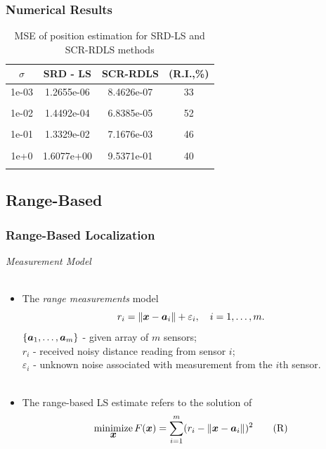 \documentclass [t] {beamer} %
\begin{document}
\begin{frame} %
\frametitle{Numerical Results}
\begin{table}
\phantom{m}
\caption{MSE of position estimation for SRD-LS and SCR-RDLS methods}
\begin{tabular}{||c||c|c|c||} 
\hhline{|t:====:t|} 
$\sigma$ & SRD - LS & SCR-RDLS & (R.I.,\%)  \\ \hline
1e-03&	1.2655e-06  & 8.4626e-07 &  33 \\ &&&\\
1e-02&	1.4492e-04 &  6.8385e-05 &  52 \\ &&&\\
1e-01&	1.3329e-02 & 7.1676e-03 &   46 \\ &&&\\
1e+0&	1.6077e+00 &  9.5371e-01 &   40  \\ %
\hhline{|b:====:b|} 
\end{tabular}
\end{table}
\end{frame}

\subsection{Range-Based}

\begin{frame} %
\frametitle{Range-Based Localization}
{\large \textit{Measurement Model}} 
\\~\\
\normalsize
\begin{itemize}
\item
The \textit{range measurements} model
\begin{equation} 
\nonumber
r_i = \|{\mbox{\boldmath$x$}} - {\mbox{\boldmath$a$}}_i\| + \varepsilon_i, \quad i = 1, \ldots , m.
\end{equation}  
$\{\mbox{\boldmath$a$}_1,\ldots, \mbox{\boldmath$a$}_m\}$ - given array of $m$ sensors;\\
$r_i$ - received noisy distance reading from sensor $i$; \\
$\varepsilon_i$ - unknown noise associated with measurement from the $i$th sensor. \\ ~\\

\item
The range-based LS  estimate refers to the solution of%
\begin{equation} \label{R-LS} 
\mathop{\mbox{minimize}}_{\mbox{\boldmath$x$}} F(\mbox{\boldmath$x$})=\sum_{i=1}^{m} (r_i - \|{\mbox{\boldmath$x$}} - {\mbox{\boldmath$a$}}_i\|)^2	\tag{R}
\end{equation}
\end{itemize}
\end{frame}
\end{document}
